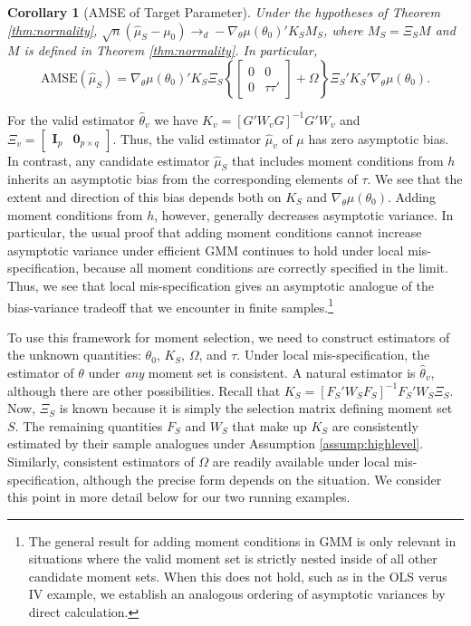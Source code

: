 \documentclass[12pt]{article}
\newtheorem{cor}{Corollary}[section]
\theoremstyle{definition}
\begin{document}
\begin{cor}[AMSE of Target Parameter]
\label{cor:target}
Under the hypotheses of Theorem \ref{thm:normality}, $\sqrt{n}\left(\widehat{\mu}_S - \mu_0\right)\rightarrow_d-\nabla_\theta\mu(\theta_0)'K_S M_S$, where $M_S = \Xi_S M$ and $M$ is defined in Theorem \ref{thm:normality}. In particular,
	$$\mbox{AMSE}\left(\widehat{\mu}_S\right) = \nabla_\theta\mu(\theta_0)'K_S \Xi_S \left\{\left[\begin{array}{cc}0&0\\0&\tau\tau'\end{array}\right] + \Omega\right\}\Xi_S'K_S'\nabla_\theta\mu(\theta_0).$$
\end{cor}

For the valid estimator $\widehat{\theta}_v$ we have $K_v = \left[G'W_{v}G\right]^{-1}G' W_{v}$ and $\Xi_v =\left[\begin{array}{cc} \mathbf{I}_p& \mathbf{0}_{p\times q} \end{array} \right]$. Thus, the valid estimator $\widehat{\mu}_v$ of $\mu$ has zero asymptotic bias. In contrast, any candidate estimator $\widehat{\mu}_S$ that includes moment conditions from $h$ inherits an asymptotic bias from the corresponding elements of $\tau$. We see that the extent and direction of this bias depends both on $K_S$ and $\nabla_\theta\mu(\theta_0)$. Adding moment conditions from $h$, however, generally decreases asymptotic variance. In particular, the usual proof that adding moment conditions cannot increase asymptotic variance under efficient GMM \citep[see for example][ch.\ 6]{Hallbook} continues to hold under local mis-specification, because all moment conditions are correctly specified in the limit. Thus, we see that local mis-specification gives an asymptotic analogue of the bias-variance tradeoff that we encounter in finite samples.\footnote{The general result for adding moment conditions in GMM is only relevant in situations where the valid moment set is strictly nested inside of all other candidate moment sets. When this does not hold, such as in the OLS verus IV example, we establish an analogous ordering of asymptotic variances by direct calculation.} 

To use this framework for moment selection, we need to construct estimators of the unknown quantities: $\theta_0$, $K_S$, $\Omega$, and $\tau$. Under local mis-specification, the estimator of $\theta$ under \emph{any} moment set is consistent. A natural estimator is $\widehat{\theta}_v$, although there are other possibilities. Recall that $K_S = [F_S'W_SF_S]^{-1} F_S'W_S \Xi_S$. Now, $\Xi_S$ is known because it is simply the selection matrix defining moment set $S$. The remaining quantities $F_S$ and $W_S$ that make up $K_S$ are consistently estimated by their sample analogues under Assumption \ref{assump:highlevel}. Similarly, consistent estimators of $\Omega$ are readily available under local mis-specification, although the precise form depends on the situation. We consider this point in more detail below for our two running examples.
\end{document}
